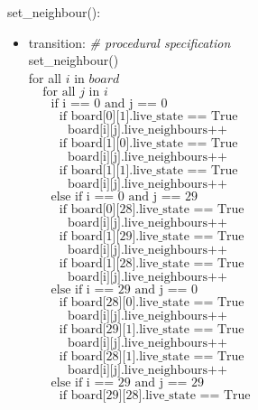 \documentclass[12pt]{article}
\begin{document}
\noindent set\_neighbour():
\begin{itemize}
\item transition: \textit{\# procedural specification}\\
set\_neighbour()\\
for all $i$ in $board$\\
$~~~~~\text{for all $j$ in $i$}$\\
$~~~~~~~~\text{if i == 0 and j == 0}$\\
$~~~~~~~~~~~\text{if board[0][1].live\_state == True}$\\
$~~~~~~~~~~~~~~\text{board[i][j].live\_neighbours++}$\\
$~~~~~~~~~~~\text{if board[1][0].live\_state == True}$\\
$~~~~~~~~~~~~~~\text{board[i][j].live\_neighbours++}$\\
$~~~~~~~~~~~\text{if board[1][1].live\_state == True}$\\
$~~~~~~~~~~~~~~\text{board[i][j].live\_neighbours++}$\\
$~~~~~~~~\text{else if i == 0 and j == 29}$\\
$~~~~~~~~~~~\text{if board[0][28].live\_state == True}$\\
$~~~~~~~~~~~~~~\text{board[i][j].live\_neighbours++}$\\
$~~~~~~~~~~~\text{if board[1][29].live\_state == True}$\\
$~~~~~~~~~~~~~~\text{board[i][j].live\_neighbours++}$\\
$~~~~~~~~~~~\text{if board[1][28].live\_state == True}$\\
$~~~~~~~~~~~~~~\text{board[i][j].live\_neighbours++}$\\
$~~~~~~~~\text{else if i == 29 and j == 0}$\\
$~~~~~~~~~~~\text{if board[28][0].live\_state == True}$\\
$~~~~~~~~~~~~~~\text{board[i][j].live\_neighbours++}$\\
$~~~~~~~~~~~\text{if board[29][1].live\_state == True}$\\
$~~~~~~~~~~~~~~\text{board[i][j].live\_neighbours++}$\\
$~~~~~~~~~~~\text{if board[28][1].live\_state == True}$\\
$~~~~~~~~~~~~~~\text{board[i][j].live\_neighbours++}$\\
$~~~~~~~~\text{else if i == 29 and j == 29}$\\
$~~~~~~~~~~~\text{if board[29][28].live\_state == True}$\\

\end{itemize}
\end{document}
